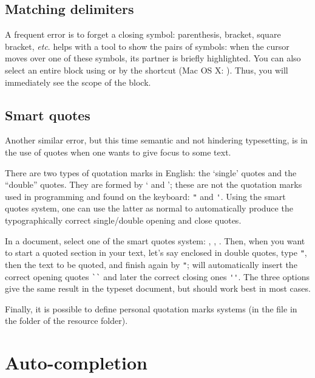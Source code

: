 \subsection{Matching delimiters}

A frequent error is to forget a closing symbol: parenthesis, bracket, square bracket, \emph{etc}. {\Tw} helps with a tool to show the pairs of symbols: when the cursor moves over one of these symbols, its partner is briefly highlighted. You can also select an entire block using \submenu{} or by the shortcut  (Mac OS X: ). Thus, you will immediately see the scope of the block.

\subsection{Smart quotes}

Another similar error, but this time semantic and not hindering typesetting, is in the use of quotes when one wants to give focus to some text.

There are two types of quotation marks in English: the `single' quotes and the ``double'' quotes. They are formed by ` and '; these are not the quotation marks used in programming and found on the keyboard: \verb|"| and \verb|'|. Using the {\Tw} smart quotes system, one can use the latter as normal to automatically produce the typographically correct single/double opening and close quotes.

In a  document, select one of the smart quotes system: \submenu{}\submenu{}, \submenu{}, \submenu{}. Then, when you want to start a quoted section in your text, let's say enclosed in double quotes, type \verb|"|, then the text to be quoted, and finish again by \verb|"|; {\Tw} will automatically insert the correct opening quotes \verb|``| and later the correct closing ones \verb|''|. The three options give the same result in the typeset document, but  should work best in most cases.

Finally, it is possible to define personal quotation marks systems (in the file  in the  folder of the resource folder).

\section{Auto-completion}

